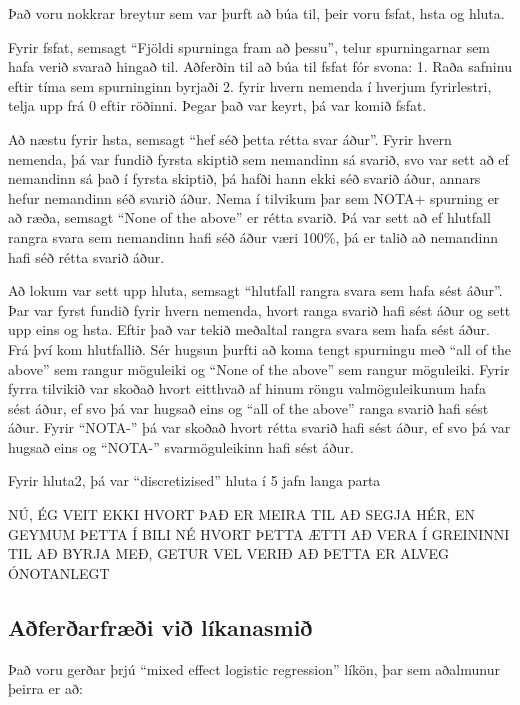 \documentclass[
  12pt,
]{article}
\begin{document}
Það voru nokkrar breytur sem var þurft að búa til, þeir voru fsfat, hsta og hluta.

Fyrir fsfat, semsagt ``Fjöldi spurninga fram að þessu'', telur spurningarnar sem hafa verið svarað hingað til. Aðferðin til að búa til fsfat fór svona:
1. Raða safninu eftir tíma sem spurninginn byrjaði
2. fyrir hvern nemenda í hverjum fyrirlestri, telja upp frá 0 eftir röðinni.
Þegar það var keyrt, þá var komið fsfat.

Að næstu fyrir hsta, semsagt ``hef séð þetta rétta svar áður''. Fyrir hvern nemenda, þá var fundið fyrsta skiptið sem nemandinn sá svarið, svo var sett að ef nemandinn sá það í fyrsta skiptið, þá hafði hann ekki séð svarið áður, annars hefur nemandinn séð svarið áður. Nema í tilvikum þar sem NOTA+ spurning er að ræða, semsagt ``None of the above'' er rétta svarið. Þá var sett að ef hlutfall rangra svara sem nemandinn hafi séð áður væri 100\%, þá er talið að nemandinn hafi séð rétta svarið áður.

Að lokum var sett upp hluta, semsagt ``hlutfall rangra svara sem hafa sést áður''. Þar var fyrst fundið fyrir hvern nemenda, hvort ranga svarið hafi sést áður og sett upp eins og hsta. Eftir það var tekið meðaltal rangra svara sem hafa sést áður. Frá því kom hlutfallið. Sér hugsun þurfti að koma tengt spurningu með ``all of the above'' sem rangur möguleiki og ``None of the above'' sem rangur möguleiki. Fyrir fyrra tilvikið var skoðað hvort eitthvað af hinum röngu valmöguleikunum hafa sést áður, ef svo þá var hugsað eins og ``all of the above'' ranga svarið hafi sést áður. Fyrir ``NOTA-'' þá var skoðað hvort rétta svarið hafi sést áður, ef svo þá var hugsað eins og ``NOTA-'' svarmöguleikinn hafi sést áður.

Fyrir hluta2, þá var ``discretizised'' hluta í 5 jafn langa parta

NÚ, ÉG VEIT EKKI HVORT ÞAÐ ER MEIRA TIL AÐ SEGJA HÉR, EN GEYMUM ÞETTA Í BILI
NÉ HVORT ÞETTA ÆTTI AÐ VERA Í GREININNI TIL AÐ BYRJA MEÐ, GETUR VEL VERIÐ AÐ ÞETTA ER ALVEG ÓNOTANLEGT

\hypertarget{auxf0feruxf0arfruxe6uxf0i-viuxf0-luxedkanasmiuxf0}{%
\subsection{Aðferðarfræði við líkanasmið}\label{auxf0feruxf0arfruxe6uxf0i-viuxf0-luxedkanasmiuxf0}}

Það voru gerðar þrjú ``mixed effect logistic regression'' líkön, þar sem aðalmunur þeirra er að:
\end{document}
